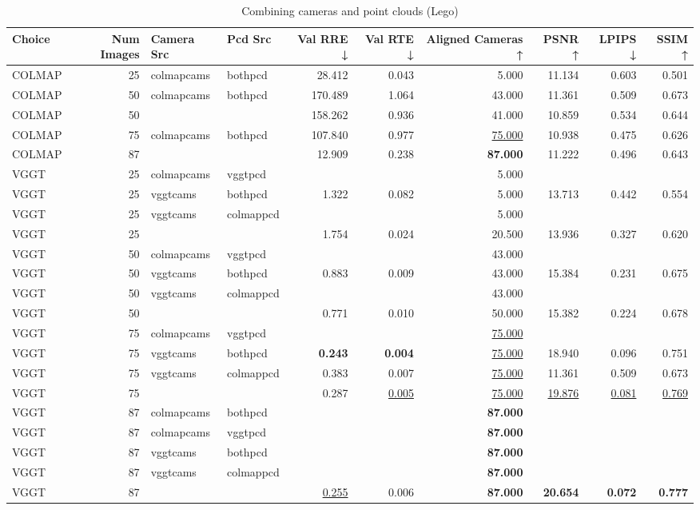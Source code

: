 \begin{table}[H]
\caption{Combining cameras and point clouds (Lego)}
\label{tab:07_combined_lego}
\begin{tabular}{lrllrrrrrr}
\toprule
Choice & Num Images & Camera Src & Pcd Src & Val RRE ↓ & Val RTE ↓ & Aligned Cameras ↑ & PSNR ↑ & LPIPS ↓ & SSIM ↑ \\
\midrule
COLMAP & 25 & colmapcams & bothpcd & 28.412 & 0.043 & 5.000 & 11.134 & 0.603 & 0.501 \\
COLMAP & 50 & colmapcams & bothpcd & 170.489 & 1.064 & 43.000 & 11.361 & 0.509 & 0.673 \\
COLMAP & 50 &  &  & 158.262 & 0.936 & 41.000 & 10.859 & 0.534 & 0.644 \\
COLMAP & 75 & colmapcams & bothpcd & 107.840 & 0.977 & \underline{75.000} & 10.938 & 0.475 & 0.626 \\
COLMAP & 87 &  &  & 12.909 & 0.238 & \textbf{87.000} & 11.222 & 0.496 & 0.643 \\
VGGT & 25 & colmapcams & vggtpcd &  &  & 5.000 &  &  &  \\
VGGT & 25 & vggtcams & bothpcd & 1.322 & 0.082 & 5.000 & 13.713 & 0.442 & 0.554 \\
VGGT & 25 & vggtcams & colmappcd &  &  & 5.000 &  &  &  \\
VGGT & 25 &  &  & 1.754 & 0.024 & 20.500 & 13.936 & 0.327 & 0.620 \\
VGGT & 50 & colmapcams & vggtpcd &  &  & 43.000 &  &  &  \\
VGGT & 50 & vggtcams & bothpcd & 0.883 & 0.009 & 43.000 & 15.384 & 0.231 & 0.675 \\
VGGT & 50 & vggtcams & colmappcd &  &  & 43.000 &  &  &  \\
VGGT & 50 &  &  & 0.771 & 0.010 & 50.000 & 15.382 & 0.224 & 0.678 \\
VGGT & 75 & colmapcams & vggtpcd &  &  & \underline{75.000} &  &  &  \\
VGGT & 75 & vggtcams & bothpcd & \textbf{0.243} & \textbf{0.004} & \underline{75.000} & 18.940 & 0.096 & 0.751 \\
VGGT & 75 & vggtcams & colmappcd & 0.383 & 0.007 & \underline{75.000} & 11.361 & 0.509 & 0.673 \\
VGGT & 75 &  &  & 0.287 & \underline{0.005} & \underline{75.000} & \underline{19.876} & \underline{0.081} & \underline{0.769} \\
VGGT & 87 & colmapcams & bothpcd &  &  & \textbf{87.000} &  &  &  \\
VGGT & 87 & colmapcams & vggtpcd &  &  & \textbf{87.000} &  &  &  \\
VGGT & 87 & vggtcams & bothpcd &  &  & \textbf{87.000} &  &  &  \\
VGGT & 87 & vggtcams & colmappcd &  &  & \textbf{87.000} &  &  &  \\
VGGT & 87 &  &  & \underline{0.255} & 0.006 & \textbf{87.000} & \textbf{20.654} & \textbf{0.072} & \textbf{0.777} \\
\bottomrule
\end{tabular}
\end{table}

